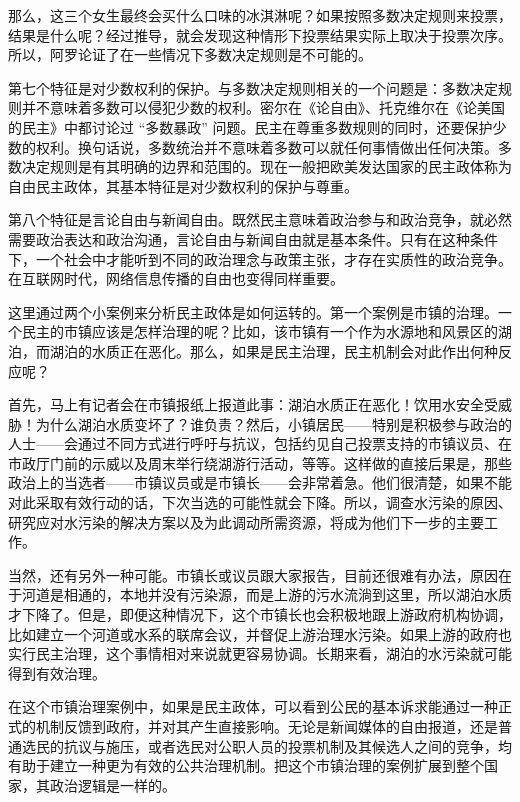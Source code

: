 那么，这三个女生最终会买什么口味的冰淇淋呢？如果按照多数决定规则来投票，结果是什么呢？经过推导，就会发现这种情形下投票结果实际上取决于投票次序。所以，阿罗论证了在一些情况下多数决定规则是不可能的。

第七个特征是对少数权利的保护。与多数决定规则相关的一个问题是：多数决定规则并不意味着多数可以侵犯少数的权利。密尔在《论自由》、托克维尔在《论美国的民主》中都讨论过 “多数暴政” 问题。民主在尊重多数规则的同时，还要保护少数的权利。换句话说，多数统治并不意味着多数可以就任何事情做出任何决策。多数决定规则是有其明确的边界和范围的。现在一般把欧美发达国家的民主政体称为自由民主政体，其基本特征是对少数权利的保护与尊重。

第八个特征是言论自由与新闻自由。既然民主意味着政治参与和政治竞争，就必然需要政治表达和政治沟通，言论自由与新闻自由就是基本条件。只有在这种条件下，一个社会中才能听到不同的政治理念与政策主张，才存在实质性的政治竞争。在互联网时代，网络信息传播的自由也变得同样重要。


这里通过两个小案例来分析民主政体是如何运转的。第一个案例是市镇的治理。一个民主的市镇应该是怎样治理的呢？比如，该市镇有一个作为水源地和风景区的湖泊，而湖泊的水质正在恶化。那么，如果是民主治理，民主机制会对此作出何种反应呢？

首先，马上有记者会在市镇报纸上报道此事：湖泊水质正在恶化！饮用水安全受威胁！为什么湖泊水质变坏了？谁负责？然后，小镇居民——特别是积极参与政治的人士——会通过不同方式进行呼吁与抗议，包括约见自己投票支持的市镇议员、在市政厅门前的示威以及周末举行绕湖游行活动，等等。这样做的直接后果是，那些政治上的当选者——市镇议员或是市镇长——会非常着急。他们很清楚，如果不能对此采取有效行动的话，下次当选的可能性就会下降。所以，调查水污染的原因、研究应对水污染的解决方案以及为此调动所需资源，将成为他们下一步的主要工作。

当然，还有另外一种可能。市镇长或议员跟大家报告，目前还很难有办法，原因在于河道是相通的，本地并没有污染源，而是上游的污水流淌到这里，所以湖泊水质才下降了。但是，即便这种情况下，这个市镇长也会积极地跟上游政府机构协调，比如建立一个河道或水系的联席会议，并督促上游治理水污染。如果上游的政府也实行民主治理，这个事情相对来说就更容易协调。长期来看，湖泊的水污染就可能得到有效治理。

在这个市镇治理案例中，如果是民主政体，可以看到公民的基本诉求能通过一种正式的机制反馈到政府，并对其产生直接影响。无论是新闻媒体的自由报道，还是普通选民的抗议与施压，或者选民对公职人员的投票机制及其候选人之间的竞争，均有助于建立一种更为有效的公共治理机制。把这个市镇治理的案例扩展到整个国家，其政治逻辑是一样的。

